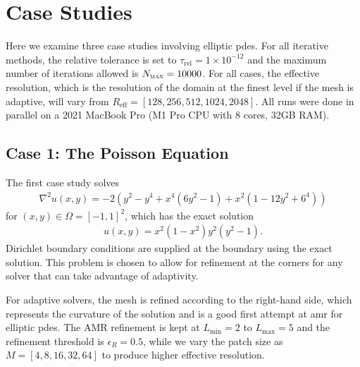 \section{Case Studies}
\label{sec:case-studies}

Here we examine three case studies involving elliptic \gls{pdes}. For all iterative methods, the relative tolerance is set to $\tau_{\text{rel}} = 1 \times 10^{-12}$ and the maximum number of iterations allowed is $N_{\textsc{max}} = 10000$. For all cases, the effective resolution, which is the resolution of the domain at the finest level if the mesh is adaptive, will vary from $R_{\text{eff}} = [128, 256, 512, 1024, 2048]$. All runs were done in parallel on a 2021 MacBook Pro (M1 Pro CPU with 8 cores, 32GB RAM).

\subsection{Case 1: The Poisson Equation}
\label{sub:case01}

The first case study solves
\begin{align}
    \nabla^2 u(x,y) = -2(y^2 - y^4 + x^4(6y^2 - 1) + x^2 (1 - 12y^2 + 6^4))
\end{align}
for $(x,y) \in \Omega = [-1,1]^2$, which has the exact solution
\begin{align}
    u(x,y) = x^2 (1 - x^2) y^2 (y^2 - 1).
\end{align}
Dirichlet boundary conditions are supplied at the boundary using the exact solution. This problem is chosen to allow for refinement at the corners for any solver that can take advantage of adaptivity.

For adaptive solvers, the mesh is refined according to the right-hand side, which represents the curvature of the solution and is a good first attempt at \gls{amr} for elliptic \gls{pdes}. The AMR refinement is kept at $L_{\text{min}} = 2$ to $L_{\text{max}} = 5$ and the refinement threshold is $\epsilon_R = 0.5$, while we vary the patch size as $M = [4, 8, 16, 32, 64]$ to produce higher effective resolution.


